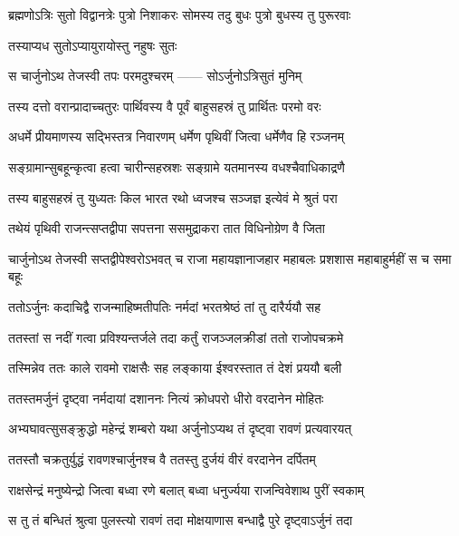 \twolineshloka
{ब्रह्मणोऽत्रिः सुतो विद्वानत्रेः पुत्रो निशाकरः}
{सोमस्य तदु बुधः पुत्रो बुधस्य तु पुरूरवाः}


\twolineshloka
{तस्याप्यध सुतोऽप्यायुरायोस्तु नहुषः सुतः}
{}







\twolineshloka
{स चार्जुनोऽथ तेजस्वी तपः परमदुश्चरम्}
{------ सोऽर्जुनोऽत्रिसुतं मुनिम्}


\twolineshloka
{तस्य दत्तो वरान्प्रादाच्चतुरः पार्थिवस्य वै}
{पूर्वं बाहुसहस्रं तु प्रार्थितः परमो वरः}


\twolineshloka
{अधर्मे प्रीयमाणस्य सद्भिस्तत्र निवारणम्}
{धर्मेण पृथिवीं जित्वा धर्मेणैव हि रञ्जनम्}


\twolineshloka
{सङ्ग्रामान्सुबहून्कृत्वा हत्वा चारीन्सहस्रशः}
{सङ्ग्रामे यतमानस्य वधश्चैवाधिकाद्रणै}


\twolineshloka
{तस्य बाहुसहस्रं तु युध्यतः किल भारत}
{रथो ध्वजश्च सञ्जज्ञ इत्येवं मे श्रुतं परा}


\twolineshloka
{तथेयं पृथिवी राजन्त्सप्तद्वीपा सपत्तना}
{ससमुद्राकरा तात विधिनोग्रेण वै जिता}


\threelineshloka
{चार्जुनोऽथ तेजस्वी सप्तद्वीपेश्वरोऽभवत्}
{च राजा महायज्ञानाजहार महाबलः}
{प्रशशास महाबाहुर्महीं स च समा बहूः}


\twolineshloka
{ततोऽर्जुनः कदाचिद्वै राजन्माहिष्मतीपतिः}
{नर्मदां भरतश्रेष्ठं तां तु दारैर्ययौ सह}


\twolineshloka
{ततस्तां स नदीं गत्वा प्रविश्यन्तर्जले तदा}
{कर्तुं राजञ्जलक्रीडां ततो राजोपचक्रमे}


\twolineshloka
{तस्मिन्नेव ततः काले रावमो राक्षसैः सह}
{लङ्काया ईश्वरस्तात तं देशं प्रययौ बली}


\twolineshloka
{ततस्तमर्जुनं दृष्ट्वा नर्मदायां दशाननः}
{नित्यं क्रोधपरो धीरो वरदानेन मोहितः}


\twolineshloka
{अभ्यघावत्सुसङ्क्रुद्धो महेन्द्रं शम्बरो यथा}
{अर्जुनोऽप्यथ तं दृष्ट्वा रावणं प्रत्यवारयत्}


\twolineshloka
{ततस्तौ चक्रतुर्युद्धं रावणश्चार्जुनश्च वै}
{ततस्तु दुर्जयं वीरं वरदानेन दर्पितम्}


\twolineshloka
{राक्षसेन्द्रं मनुष्येन्द्रो जित्वा बध्वा रणे बलात्}
{बध्वा धनुर्ज्यया राजन्विवेशाथ पुरीं स्वकाम्}


\twolineshloka
{स तु तं बन्धितं श्रुत्वा पुलस्त्यो रावणं तदा}
{मोक्षयाणास बन्धाद्वै पुरे दृष्ट्वाऽर्जुनं तदा}


